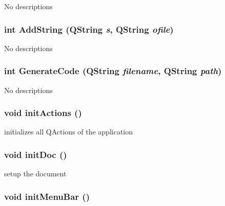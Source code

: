 No descriptions \hypertarget{class_bxbuilder_app_2ba78d3f4aa8b7447c6dfe33e290cf17}{
\subsubsection[{AddString}]{\setlength{\rightskip}{0pt plus 5cm}int AddString (QString {\em s}, \/  QString {\em ofile})}}
\label{class_bxbuilder_app_2ba78d3f4aa8b7447c6dfe33e290cf17}


No descriptions \hypertarget{class_bxbuilder_app_9a81d6d109d6390aa3e68b61be86aeb0}{
\subsubsection[{GenerateCode}]{\setlength{\rightskip}{0pt plus 5cm}int GenerateCode (QString {\em filename}, \/  QString {\em path})}}
\label{class_bxbuilder_app_9a81d6d109d6390aa3e68b61be86aeb0}


No descriptions \hypertarget{class_bxbuilder_app_3add754bdd339f64be1dff4546be65f5}{
\subsubsection[{initActions}]{\setlength{\rightskip}{0pt plus 5cm}void initActions ()}}
\label{class_bxbuilder_app_3add754bdd339f64be1dff4546be65f5}


initializes all QActions of the application \hypertarget{class_bxbuilder_app_1b46eee64082444023546bcbda536ef3}{
\subsubsection[{initDoc}]{\setlength{\rightskip}{0pt plus 5cm}void initDoc ()}}
\label{class_bxbuilder_app_1b46eee64082444023546bcbda536ef3}


setup the document \hypertarget{class_bxbuilder_app_0b0e9cd41d19d9cb52443c381a519994}{
\subsubsection[{initMenuBar}]{\setlength{\rightskip}{0pt plus 5cm}void initMenuBar ()}}
\label{class_bxbuilder_app_0b0e9cd41d19d9cb52443c381a519994}


